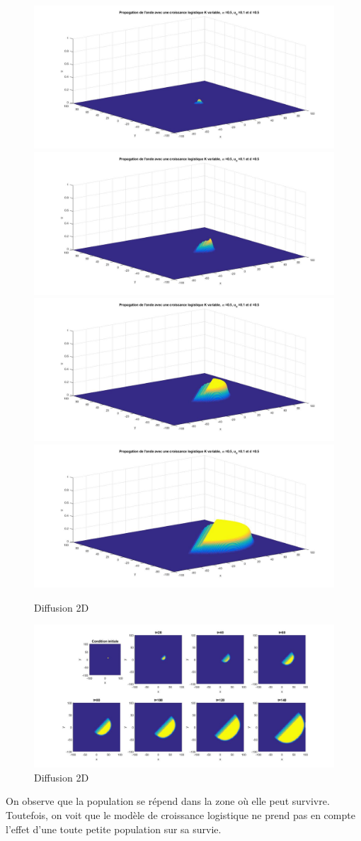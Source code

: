 \documentclass[a4paper,11pt]{article}
\begin{document}
\begin{figure}[H]
	\centering
	\includegraphics[width=0.5\linewidth]{SimulationKPP/Enviro/poleNord1}\hfill
	\includegraphics[width=0.5\linewidth]{SimulationKPP/Enviro/poleNord3}\hfill
	\includegraphics[width=0.5\linewidth]{SimulationKPP/Enviro/poleNord5}\hfill
	\includegraphics[width=0.5\linewidth]{SimulationKPP/Enviro/poleNord8}
	\caption{Diffusion 2D}
\end{figure}
\begin{figure}[H]
	\centering
	\includegraphics[width=0.7\linewidth]{SimulationKPP/Enviro/PolenordVueHaut}
	\caption{Diffusion 2D}
\end{figure}

On observe que la population se répend dans la zone où elle peut survivre.
Toutefois, on voit que le modèle de croissance logistique ne prend pas en compte l'effet d'une toute petite population sur sa survie. 
\end{document}
